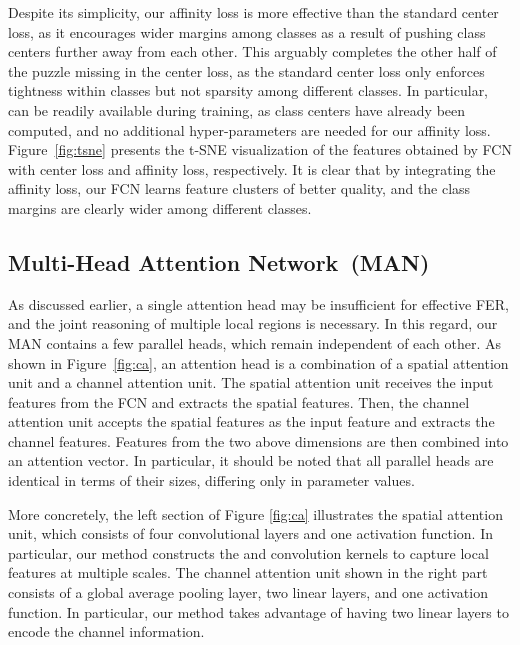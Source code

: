 \documentclass{article}
\begin{document}
Despite its simplicity, our affinity loss is more effective than the standard center loss, as it encourages wider margins among classes as a result of pushing class centers further away from each other. This arguably completes the other half of the puzzle missing in the center loss, as the standard center loss only enforces tightness within classes but not sparsity among different classes. In particular,  can be readily available during training, as {class centers have already been computed}, and no additional hyper-parameters are needed for our affinity loss. Figure~\ref{fig:tsne} {presents} the t-SNE visualization of the features obtained by FCN with center loss and affinity loss, respectively. It is clear that by integrating the affinity loss, our FCN learns feature clusters of better quality, and the class margins are clearly wider among different classes. 




\subsection{Multi-Head Attention Network~(MAN)}
\label{sec:man}
As discussed earlier, a single attention head may be insufficient for effective FER, and the joint reasoning of multiple local regions is necessary. In this regard, our MAN contains a few parallel heads, which remain independent of each other. As shown in Figure~\ref{fig:ca}, an attention head is a combination of a spatial attention unit and a channel attention unit. The spatial attention unit receives the input features from the FCN and extracts the spatial features. Then, the channel attention unit accepts the spatial features as the input feature and extracts the channel features. Features from the two above dimensions are then combined into an attention vector. {In particular, it should be noted that all parallel heads are identical in terms of their sizes, differing only in parameter values.} 

More concretely, the left section of Figure \ref{fig:ca} illustrates the spatial attention unit, which consists of four convolutional layers and one activation function. In particular, our method constructs the  and  convolution kernels to capture local features at multiple scales.
The channel attention unit shown in the right part consists of a global average pooling layer, two linear layers, and one activation function. In particular, our method takes advantage of having two linear layers to encode the channel information.
\end{document}
